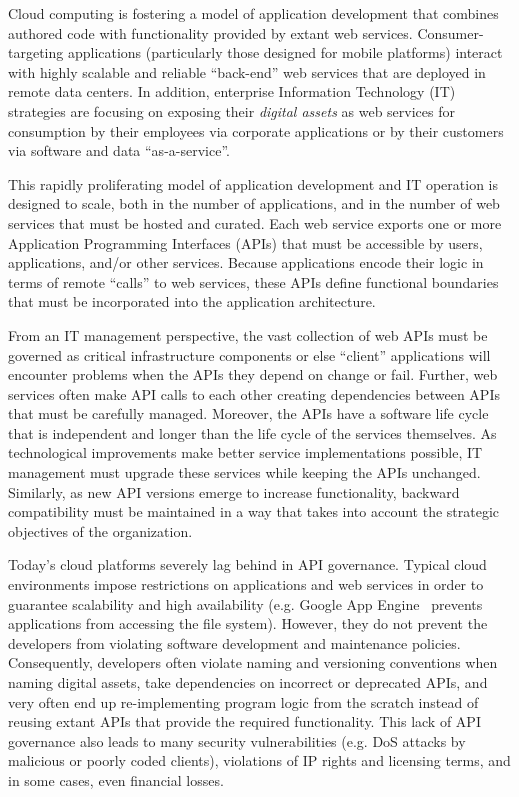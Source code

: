 Cloud computing is fostering a model of 
application development that combines authored code with functionality
provided by extant web services.  Consumer-targeting applications 
(particularly those designed for mobile platforms) interact with highly
scalable and reliable ``back-end'' web services that are deployed
in remote data centers.  In addition, enterprise
Information Technology (IT) strategies are focusing on 
exposing their {\em digital assets} as
web services for consumption
by their employees via corporate applications or
by their customers via software and data ``as-a-service''.

This rapidly proliferating model of application development and IT operation
is designed to scale, both in the number of applications, 
and in the number of web services that must be
hosted and curated.  Each web service exports one or more Application Programming
Interfaces (APIs) that must be accessible by users, applications, and/or
other services.
Because applications encode their logic in terms of
remote ``calls'' to web services,
these APIs define functional boundaries that must be incorporated into the
application architecture.  

From an IT management perspective, the vast collection of web APIs must be
governed as critical infrastructure components or else ``client'' applications
will encounter problems when the APIs they depend on change or fail.  
Further, web services often make API calls to each other 
creating dependencies between APIs that must be carefully managed.
Moreover, the APIs have a software life cycle that is
independent and longer than the life cycle of the services themselves. 
As technological improvements make better service implementations possible, IT
management must upgrade these services while keeping the APIs unchanged.
Similarly, as new API versions emerge to increase functionality, backward
compatibility must be maintained in a way that takes into
account the strategic objectives of the organization.  

Today's cloud platforms severely lag behind in 
API governance. Typical cloud environments impose restrictions
on applications and web services in order to guarantee scalability
and high availability (e.g. Google App Engine~\cite{gae} prevents applications from accessing
the file system). 
However, they do not prevent the developers from violating
software development and maintenance policies. 
Consequently, developers often violate naming and versioning conventions
when naming digital assets, take dependencies
on incorrect or deprecated APIs, and very often end up re-implementing program logic
from the scratch instead of reusing extant APIs that provide the required functionality.
This lack of API governance also leads to many security vulnerabilities (e.g. DoS attacks
by malicious or poorly coded clients), violations of IP rights and licensing terms, and in
some cases, even financial losses. 

